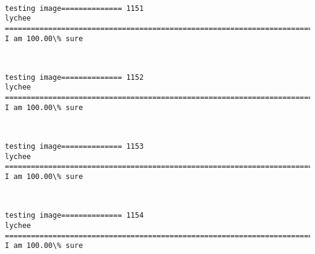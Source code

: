 \documentclass[11pt]{article}
\begin{document}
    \begin{center}
    \end{center}
    { \hspace*{\fill} \\}
    
    \begin{Verbatim}[commandchars=\\\{\}]
testing image============== 1151
lychee
============================================================================
I am 100.00\% sure

    \end{Verbatim}

    \begin{center}
    \end{center}
    { \hspace*{\fill} \\}
    
    \begin{Verbatim}[commandchars=\\\{\}]
testing image============== 1152
lychee
============================================================================
I am 100.00\% sure

    \end{Verbatim}

    \begin{center}
    \end{center}
    { \hspace*{\fill} \\}
    
    \begin{Verbatim}[commandchars=\\\{\}]
testing image============== 1153
lychee
============================================================================
I am 100.00\% sure

    \end{Verbatim}

    \begin{center}
    \end{center}
    { \hspace*{\fill} \\}
    
    \begin{Verbatim}[commandchars=\\\{\}]
testing image============== 1154
lychee
============================================================================
I am 100.00\% sure

    \end{Verbatim}
\end{document}
